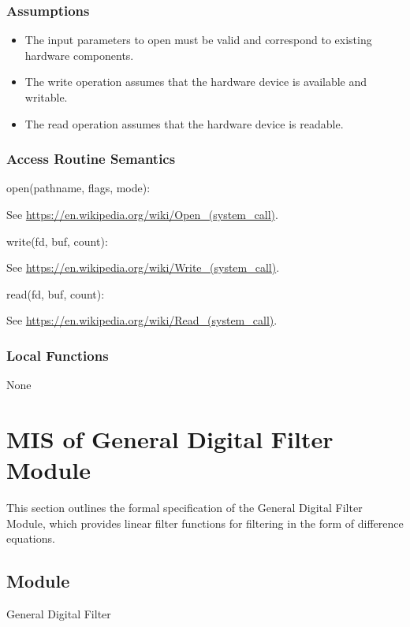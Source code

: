 \documentclass[12pt, titlepage]{article}
\begin{document}
\subsubsection{Assumptions}

\begin{itemize}
\item The input parameters to open must be valid and correspond to existing
hardware components.
\item The write operation assumes that the hardware device is available and
writable.
\item The read operation assumes that the hardware device is readable.
\end{itemize}

\subsubsection{Access Routine Semantics}

\noindent open(pathname, flags, mode):

See \url{https://en.wikipedia.org/wiki/Open_(system_call)}.

\noindent write(fd, buf, count):

See \url{https://en.wikipedia.org/wiki/Write_(system_call)}.

\noindent read(fd, buf, count):

See \url{https://en.wikipedia.org/wiki/Read_(system_call)}.

\subsubsection{Local Functions}

None

\newpage

\section{MIS of General Digital Filter Module} \label{MIS_GDF}

This section outlines the formal specification of the General Digital Filter
Module, which provides linear filter functions for filtering in the form of
difference equations.

\subsection{Module}

General Digital Filter
\end{document}

